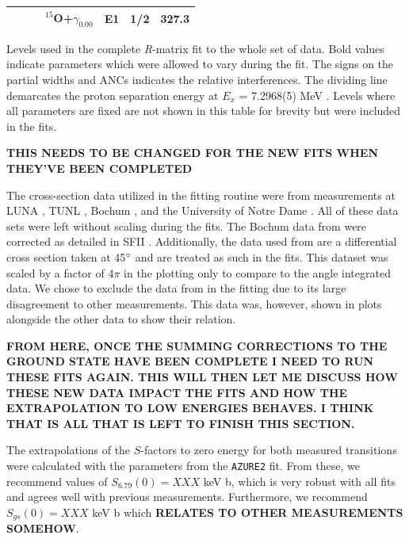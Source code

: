 \begin{table}[]
\begin{center}
\begin{threeparttable}
\begin{tabular}{c  c  c  c  c  c  c}
	&	&	&	$^{15}$O+$\gamma_{0.00}$	&	E1	&	1/2	&	\textbf{327.3}	\\
\bottomrule
\end{tabular}
\begin{tablenotes}
\small 
\item Levels used in the complete \textit{R}-matrix fit to the whole set of data. Bold values indicate parameters which were allowed to vary during the fit. The signs on the partial widths and ANCs indicates the relative interferences. The dividing line demarcates the proton separation energy at $E_x$ = 7.2968(5) MeV \cite{Ajzenberg-Selove1991}. Levels where all parameters are fixed are not shown in this table for brevity but were included in the fits.
\item \textbf{THIS NEEDS TO BE CHANGED FOR THE NEW FITS WHEN THEY'VE BEEN COMPLETED}
\end{tablenotes}
\end{threeparttable}
\label{table: fitParams}
\end{center}
\end{table}  



The cross-section data utilized in the fitting routine were from measurements at LUNA \cite{Formicola2004, Imbriani2005, Marta2008, Marta2011}, TUNL \cite{Runkle2005}, Bochum \cite{Schroder1987}, and the University of Notre Dame \cite{Li2016}. All of these data sets were left without scaling during the fits. The Bochum data from \citet{Schroder1987} were corrected as detailed in SFII \cite{Adelberger2011}. Additionally, the data used from \citet{Li2016} are a differential cross section taken at 45$\degree$ and are treated as such in the fits. This dataset was scaled by a factor of 4$\pi$ in the plotting only to compare to the angle integrated data. We chose to exclude the data from \citet{Wagner2018} in the fitting due to its large disagreement to other measurements. This data was, however, shown in plots alongside the other data to show their relation.


\textbf{FROM HERE, ONCE THE SUMMING CORRECTIONS TO THE GROUND STATE HAVE BEEN COMPLETE I NEED TO RUN THESE FITS AGAIN. THIS WILL THEN LET ME DISCUSS HOW THESE NEW DATA IMPACT THE FITS AND HOW THE EXTRAPOLATION TO LOW ENERGIES BEHAVES. I THINK THAT IS ALL THAT IS LEFT TO FINISH THIS SECTION.}

The extrapolations of the $S$-factors to zero energy for both measured transitions were calculated with the parameters from the \texttt{AZURE2} fit. From these, we recommend values of $S_{6.79}(0) = XXX$ keV b, which is very robust with all fits and agrees well with previous measurements. Furthermore, we recommend $S_{gs}(0) = XXX$ keV b which \textbf{RELATES TO OTHER MEASUREMENTS SOMEHOW}. 


%
% 
% 
